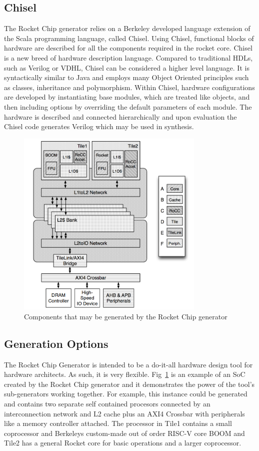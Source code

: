 \documentclass[journal]{IEEEtran}
\begin{document}
\subsection{Chisel}
The Rocket Chip generator relies on a Berkeley developed language extension of the Scala programming language, called Chisel\cite{bachrach2012chisel}. Using Chisel, functional blocks of hardware are described for all the components required in the rocket core. Chisel is a new breed of hardware description language. Compared to traditional HDLs, such as Verilog or VDHL, Chisel can be considered a higher level language. It is syntactically similar to Java and employs many Object Oriented principles such as classes, inheritance and polymorphism. Within Chisel, hardware configurations are developed by instantiating base modules, which are treated like objects, and then including options by overriding the default parameters of each module. The hardware is described and connected hierarchically and upon evaluation the Chisel code generates Verilog which may be used in synthesis.

\begin{figure} %
\centering
\includegraphics[width=9cm ]{./graphics/ExampleRocketChip.png}
\centering
\caption{Components that may be generated by the Rocket Chip generator\cite{Asanović:EECS-2016-17}}
\label{fig:rocketchip}
\end{figure}

\subsection{Generation Options}
The Rocket Chip Generator is intended to be a do-it-all hardware design tool for hardware architects. As such, it is very flexible. Fig~\ref{fig:rocketchip} is an example of an SoC created by the Rocket Chip generator and it demonstrates the power of the tool's sub-generators working together. For example, this instance could be generated and contains two separate self contained procesors connected by an interconnection network and L2 cache plus an AXI4 Crossbar with peripherals like a memory controller attached. The processor in Tile1 contains a small coprocessor and Berkeleys custom-made out of order RISC-V core BOOM and Tile2 has a general Rocket core for basic operations and a larger coprocessor.
\end{document}
